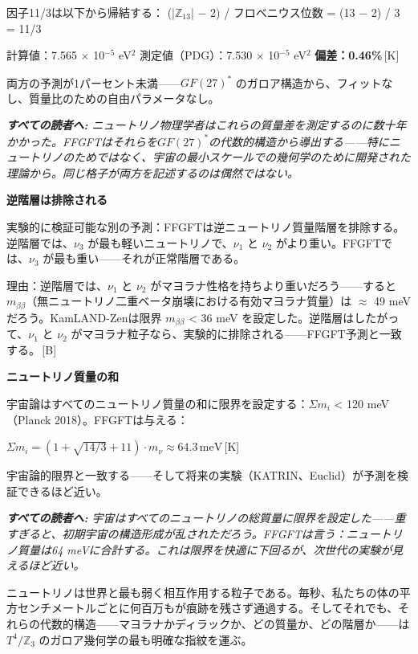 \documentclass[11pt,openany]{book}
\newcommand{\status}[1]{\penalty10000\,{\tiny\textcolor{gray!70}{[#1]}}}
\newenvironment{laierspur}{%
  \par\vspace{4pt}%
  \noindent\small\itshape\color{blue!60!black}%
  \textbf{すべての読者へ:}\enspace\ignorespaces}{%
  \par\vspace{4pt}\normalsize\normalfont\normalcolor}
\begin{document}
因子11/3は以下から帰結する：
(|$\mathbb{Z}_{13}$| $-$ 2) / フロベニウス位数 = (13 $-$ 2) / 3 = 11/3

計算値：7.565 $\times$ 10$^{-5}$ eV$^2$
測定値（PDG）：7.530 $\times$ 10$^{-5}$ eV$^2$
\textbf{偏差：0.46\%}\status{K}

両方の予測が1パーセント未満——$GF(27)^*$ のガロア構造から、フィットなし、質量比のための自由パラメータなし。

\begin{laierspur}
ニュートリノ物理学者はこれらの質量差を測定するのに数十年かかった。FFGFTはそれらを$GF(27)^*$の代数的構造から導出する——特にニュートリノのためではなく、宇宙の最小スケールでの幾何学のために開発された理論から。同じ格子が両方を記述するのは偶然ではない。
\end{laierspur}

\textbf{逆階層は排除される}

実験的に検証可能な別の予測：FFGFTは逆ニュートリノ質量階層を排除する。逆階層では、$\nu_3$ が最も軽いニュートリノで、$\nu_1$ と $\nu_2$ がより重い。FFGFTでは、$\nu_3$ が最も重い——それが正常階層である。

理由：逆階層では、$\nu_1$ と $\nu_2$ がマヨラナ性格を持ちより重いだろう——すると $m_{\beta\beta}$（無ニュートリノ二重ベータ崩壊における有効マヨラナ質量）は $\approx$ 49 meV だろう。KamLAND-Zenは限界 $m_{\beta\beta}$ < 36 meV を設定した。逆階層はしたがって、$\nu_1$ と $\nu_2$ がマヨラナ粒子なら、実験的に排除される——FFGFT予測と一致する。\status{B}

\textbf{ニュートリノ質量の和}

宇宙論はすべてのニュートリノ質量の和に限界を設定する：$\Sigma m_i$ < 120 meV（Planck 2018）。FFGFTは与える：

$\Sigma m_i = (1 + \sqrt{14/3} + 11)\cdot m_\nu \approx 64.3\,\text{meV}$\status{K}

宇宙論的限界と一致する——そして将来の実験（KATRIN、Euclid）が予測を検証できるほど近い。

\begin{laierspur}
宇宙はすべてのニュートリノの総質量に限界を設定した——重すぎると、初期宇宙の構造形成が乱されただろう。FFGFTは言う：ニュートリノ質量は64 meVに合計する。これは限界を快適に下回るが、次世代の実験が見えるほど近い。
\end{laierspur}

ニュートリノは世界と最も弱く相互作用する粒子である。毎秒、私たちの体の平方センチメートルごとに何百万もが痕跡を残さず通過する。そしてそれでも、それらの代数的構造——マヨラナかディラックか、どの質量か、どの階層か——は $T^4/\mathbb{Z}_3$ のガロア幾何学の最も明確な指紋を運ぶ。
\end{document}
